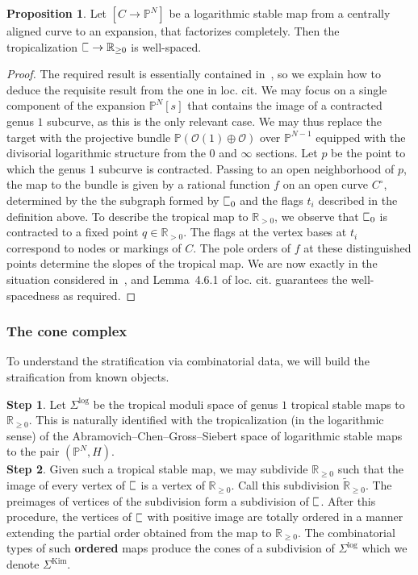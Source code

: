 \documentclass[11pt]{amsart}
\newcommand{\plC}{\scalebox{0.8}[1.3]{$\sqsubset$}}
\renewcommand{\to}{\rightarrow}
\theoremstyle{definition}
\newtheorem{prop}[thm]{Proposition}
\theoremstyle{definition}
\begin{document}
\begin{prop}\label{prop: well-spaced}
Let $[C\to \mathbb P^N]$ be a logarithmic stable map from a centrally aligned curve to an expansion, that factorizes completely. Then the tropicalization $\plC\to \mathbb R_{\geq 0}$ is well-spaced.
\end{prop}

\begin{proof}
The required result is essentially contained in~\cite[Section 4]{RSPW2}, so we explain how to deduce the requisite result from the one in loc. cit. We may focus on a single component of the expansion $\mathbb P^N[s]$ that contains the image of a contracted genus $1$ subcurve, as this is the only relevant case. We may thus replace the target with the projective bundle $\mathbb P(\mathcal O(1)\oplus \mathcal O)$ over $\mathbb P^{N-1}$ equipped with the divisorial logarithmic structure from the $0$ and $\infty$ sections. Let $p$ be the point to which the genus $1$ subcurve is contracted. Passing to an open neighborhood of $p$, the map to the bundle is given by a rational function $f$ on an open curve $C^\circ$, determined by the the subgraph formed by $\plC_0$ and the flags $t_i$ described in the definition above. To describe the tropical map to $\mathbb R_{>0}$, we observe that $\plC_0$ is contracted to a fixed point $q\in\mathbb R_{>0}$. The flags at the vertex bases at $t_i$ correspond to nodes or markings of $C$. The pole orders of $f$ at these distinguished points determine the slopes of the tropical map. We are now exactly in the situation considered in~\cite[Second Paragraph of Section~4.6]{RSPW2}, and Lemma~4.6.1 of loc. cit. guarantees the well-spacedness as required.
\end{proof}

\subsubsection{The cone complex} To understand the stratification via combinatorial data, we will build the straification from known objects. 

\noindent
\textbf{Step 1}. Let $\Sigma^{\mathrm{log}}$ be the tropical moduli space of genus $1$ tropical stable maps to $\mathbb R_{\geq 0}$. This is naturally identified with the tropicalization (in the logarithmic sense) of the Abramovich--Chen--Gross--Siebert space of logarithmic stable maps to the pair $(\mathbb P^N,H)$. \\

\noindent
\textbf{Step 2}. Given such a tropical stable map, we may subdivide $\mathbb R_{\geq 0}$ such that the image of every vertex of $\plC$ is a vertex of $\mathbb R_{\geq 0}$. Call this subdivision $\widetilde{\mathbb R}_{\geq 0}$. The preimages of vertices of the subdivision form a subdivision of $\plC$. After this procedure, the vertices of $\plC$ with positive image are totally ordered in a manner extending the partial order obtained from the map to $\mathbb R_{\geq 0}$. The combinatorial types of such \textbf{ordered} maps produce the cones of a subdivision of $\Sigma^{\mathrm{log}}$ which we denote $\Sigma^{\mathrm{Kim}}$.\\
\end{document}
